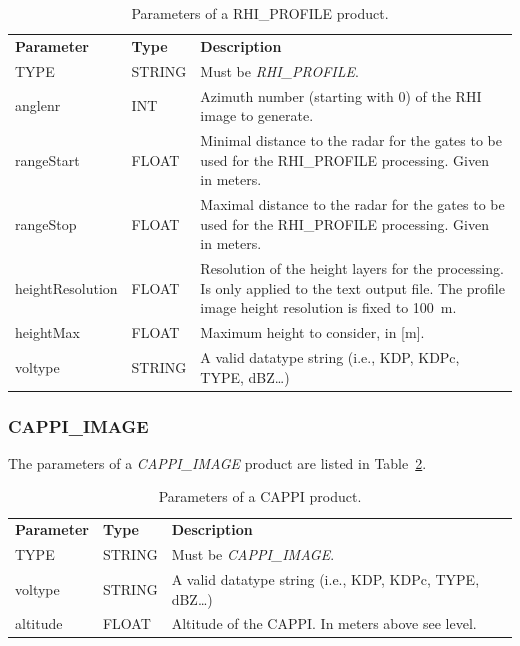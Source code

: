 \documentclass[a4paper,11pt,pdftex,twoside]{scrartcl}
\renewcommand{\bf}{\normalfont \bfseries}
\begin{document}
{{{\begin{table}[H]
 \begin{tabularx}{\textwidth}{llX}
 \bf{Parameter}  & \bf{Type}  & \bf{Description}\\
 TYPE           & STRING     & Must be \emph{RHI\_PROFILE}.\\
 anglenr        & INT        & Azimuth number (starting with 0) of the RHI image
                               to generate.\\
 rangeStart     & FLOAT      & Minimal distance to the radar for the gates to be used for the
                               RHI\_PROFILE processing. Given in meters.\\
 rangeStop      & FLOAT      & Maximal distance to the radar for the gates to be used for the
                               RHI\_PROFILE processing. Given in meters.\\
 heightResolution & FLOAT    & Resolution of the height layers for the processing. Is only
                               applied to the text output file. The profile image height
                               resolution is fixed to 100~m.\\
 heightMax & FLOAT    & Maximum height to consider, in [m].\\
  voltype        & STRING     & A valid datatype string (i.e., KDP, KDPc, TYPE, dBZ\dots)\\

 \end{tabularx}
 \caption{Parameters of a RHI\_PROFILE product.}
 \label{tab_product_rhi_profile}
 \end{table}

 \subsubsection{CAPPI\_IMAGE}
 \label{subsec_cappi_image}

The parameters of a \emph{CAPPI\_IMAGE} product are listed in Table~\ref{tab_product_cappi}.

 \begin{table}[H]
 \begin{tabularx}{\textwidth}{llX}
 \bf{Parameter}  & \bf{Type}  & \bf{Description}\\
 TYPE           & STRING     & Must be \emph{CAPPI\_IMAGE}.\\
  voltype        & STRING     & A valid datatype string (i.e., KDP, KDPc, TYPE, dBZ\dots)\\
 altitude       & FLOAT      & Altitude of the CAPPI. In meters above see level.\\
 \end{tabularx}
 \caption{Parameters of a CAPPI product.}
 \label{tab_product_cappi}
 \end{table}

}}}
\end{document}
